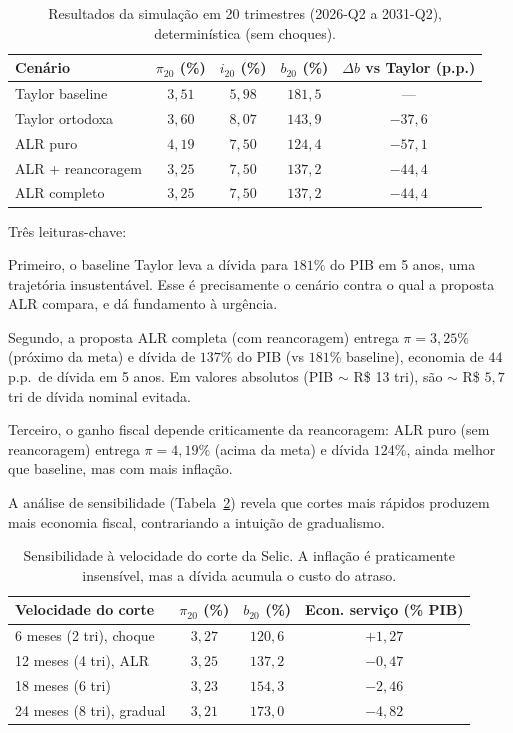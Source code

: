 \documentclass[11pt,a4paper]{article}
\begin{document}
\begin{table}[H]
\centering
\small
\begin{tabular}{lcccc}
\toprule
Cenário & $\pi_{20}$ (\%) & $i_{20}$ (\%) & $b_{20}$ (\%) & $\Delta b$ vs Taylor (p.p.) \\
\midrule
Taylor baseline & $3{,}51$ & $5{,}98$ & $181{,}5$ & --- \\
Taylor ortodoxa & $3{,}60$ & $8{,}07$ & $143{,}9$ & $-37{,}6$ \\
ALR puro & $4{,}19$ & $7{,}50$ & $124{,}4$ & $-57{,}1$ \\
ALR + reancoragem & $3{,}25$ & $7{,}50$ & $137{,}2$ & $-44{,}4$ \\
ALR completo & $3{,}25$ & $7{,}50$ & $137{,}2$ & $-44{,}4$ \\
\bottomrule
\end{tabular}
\caption{Resultados da simulação em 20 trimestres (2026-Q2 a 2031-Q2),
determinística (sem choques).}
\label{tab:sim}
\end{table}

Três leituras-chave:

Primeiro, o baseline Taylor leva a dívida para $181\%$ do PIB em 5 anos,
uma trajetória insustentável. Esse é precisamente o cenário contra
o qual a proposta ALR compara, e dá fundamento à urgência.

Segundo, a proposta ALR completa (com reancoragem) entrega $\pi = 3{,}25\%$
(próximo da meta) e dívida de $137\%$ do PIB (vs $181\%$ baseline),
economia de $44$ p.p.\ de dívida em 5 anos. Em valores absolutos (PIB
$\sim$ R\$ 13 tri), são $\sim$ R\$ $5{,}7$ tri de dívida nominal evitada.

Terceiro, o ganho fiscal depende criticamente da reancoragem: ALR puro
(sem reancoragem) entrega $\pi = 4{,}19\%$ (acima da meta) e dívida
$124\%$, ainda melhor que baseline, mas com mais inflação.

A análise de sensibilidade (Tabela~\ref{tab:sens}) revela que cortes
mais rápidos produzem mais economia fiscal, contrariando a intuição de
gradualismo.

\begin{table}[H]
\centering
\small
\begin{tabular}{lccc}
\toprule
Velocidade do corte & $\pi_{20}$ (\%) & $b_{20}$ (\%) & Econ. serviço (\% PIB) \\
\midrule
6 meses (2 tri), choque & $3{,}27$ & $120{,}6$ & $+1{,}27$ \\
12 meses (4 tri), ALR & $3{,}25$ & $137{,}2$ & $-0{,}47$ \\
18 meses (6 tri) & $3{,}23$ & $154{,}3$ & $-2{,}46$ \\
24 meses (8 tri), gradual & $3{,}21$ & $173{,}0$ & $-4{,}82$ \\
\bottomrule
\end{tabular}
\caption{Sensibilidade à velocidade do corte da Selic. A inflação é
praticamente insensível, mas a dívida acumula o custo do atraso.}
\label{tab:sens}
\end{table}
\end{document}
